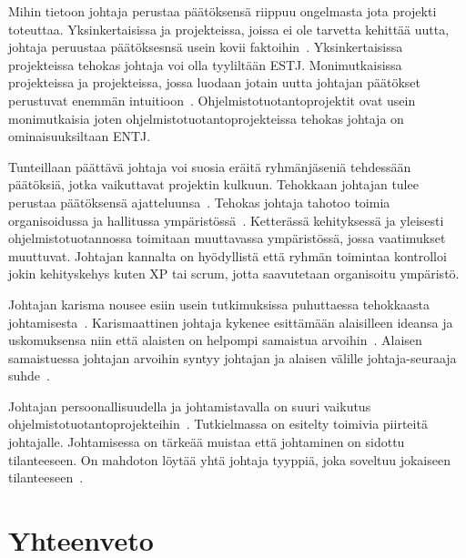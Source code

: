 \documentclass[finnish]{tktltiki2}
\theoremstyle{definition}
\theoremstyle{remark}
\begin{document}
Mihin tietoon johtaja perustaa päätöksensä riippuu ongelmasta jota projekti toteuttaa. Yksinkertaisissa ja projekteissa, joissa ei ole tarvetta kehittää uutta, johtaja peruustaa päätöksesnsä usein kovii faktoihin~\cite{bradley1997effect}. Yksinkertaisissa projekteissa tehokas johtaja voi olla tyyliltään ESTJ. Monimutkaisissa projekteissa ja projekteissa, jossa luodaan jotain uutta johtajan päätökset perustuvat enemmän intuitioon~\cite{bradley1997effect}. Ohjelmistotuotantoprojektit ovat usein monimutkaisia joten ohjelmistotuotantoprojekteissa tehokas johtaja on ominaisuuksiltaan ENTJ.  

Tunteillaan päättävä johtaja voi suosia eräitä ryhmänjäseniä tehdessään päätöksiä, jotka vaikuttavat projektin kulkuun. Tehokkaan johtajan tulee perustaa päätöksensä ajatteluunsa~\cite{bradley1997effect}. Tehokas johtaja tahotoo toimia organisoidussa ja hallitussa ympäristössä~\cite{bradley1997effect}. Ketterässä kehityksessä ja yleisesti ohjelmistotuotannossa toimitaan muuttavassa ympäristössä, jossa vaatimukset muuttuvat. Johtajan kannalta on hyödyllistä että ryhmän toimintaa kontrolloi jokin kehityskehys kuten XP tai scrum, jotta saavutetaan organisoitu ympäristö.

Johtajan karisma nousee esiin usein tutkimuksissa puhuttaessa tehokkaasta johtamisesta~\cite{Dhomne:2012:ITL:2382887.2382899, thite2000leadership}. Karismaattinen johtaja kykenee esittämään alaisilleen ideansa ja uskomuksensa niin että alaisten on helpompi samaistua arvoihin~\cite{thite2000leadership}. Alaisen samaistuessa johtajan arvoihin syntyy johtajan ja alaisen välille johtaja-seuraaja suhde~\cite{raccoon2006leadership}.  

Johtajan persoonallisuudella ja johtamistavalla on suuri vaikutus ohjelmistotuotantoprojekteihin~\cite{Wang:2009:PMP:1639950.1640049}. Tutkielmassa on esitelty toimivia piirteitä johtajalle. Johtamisessa on tärkeää muistaa että johtaminen on sidottu tilanteeseen. On mahdoton löytää yhtä johtaja tyyppiä, joka soveltuu jokaiseen tilanteeseen~\cite{thite2000leadership}.

  




\section{Yhteenveto}







 
\end{document}
